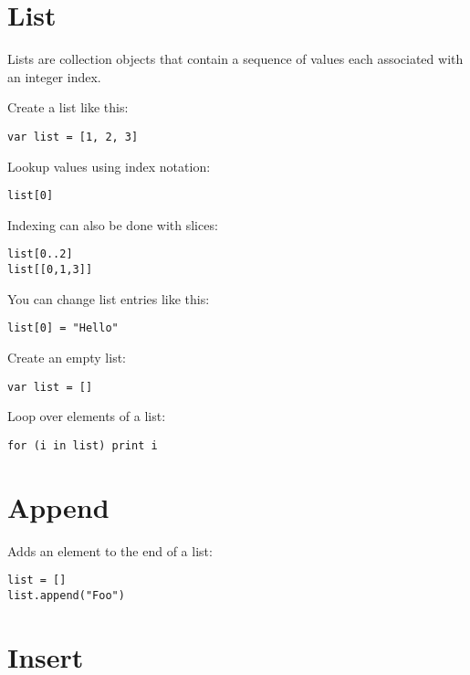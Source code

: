 \hypertarget{list}{%
\section{List}\label{list}}

Lists are collection objects that contain a sequence of values each
associated with an integer index.

Create a list like this:

\begin{lstlisting}
var list = [1, 2, 3]
\end{lstlisting}

Lookup values using index notation:

\begin{lstlisting}
list[0]
\end{lstlisting}

Indexing can also be done with slices:

\begin{lstlisting}
list[0..2]
list[[0,1,3]]
\end{lstlisting}
	

You can change list entries like this:

\begin{lstlisting}
list[0] = "Hello"
\end{lstlisting}

Create an empty list:

\begin{lstlisting}
var list = []
\end{lstlisting}

Loop over elements of a list:

\begin{lstlisting}
for (i in list) print i
\end{lstlisting}

\hypertarget{append}{%
\section{Append}\label{append}}

Adds an element to the end of a list:

\begin{lstlisting}
list = []
list.append("Foo")
\end{lstlisting}

\hypertarget{insert}{%
\section{Insert}\label{insert}}

